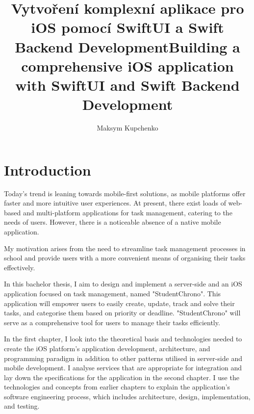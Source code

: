 \documentclass[
  language=english,
  figures=false,
  sourcecodes,
  index
]{kidiplom}
\title[czech]{Vytvoření komplexní aplikace pro iOS pomocí SwiftUI a Swift Backend Development}
\title[english]{Building a comprehensive iOS application with SwiftUI and Swift Backend Development}
\author{Maksym Kupchenko}
\begin{document}
\maketitle



\newcommand{\BibLaTeX}{\textsc{Bib}\LaTeX}

\section{Introduction}

Today's trend is leaning towards mobile-first solutions, as mobile platforms offer faster and more intuitive user experiences. At present, there exist loads of web-based and multi-platform applications for task management, catering to the needs of users. However, there is a noticeable absence of a native mobile application.

My motivation arises from the need to streamline task management processes in school and provide users with a more convenient means of organising their tasks effectively.

In this bachelor thesis, I aim to design and implement a server-side and an iOS application focused on task management, named "StudentChrono". This application will empower users to easily create, update, track and solve their tasks, and categorise them based on priority or deadline. "StudentChrono" will serve as a comprehensive tool for users to manage their tasks efficiently.

In the first chapter, I look into the theoretical basis and technologies needed to create the iOS platform's application development, architecture, and programming paradigm in addition to other patterns utilised in server-side and mobile development. I analyse services that are appropriate for integration and lay down the specifications for the application in the second chapter. I use the technologies and concepts from earlier chapters to explain the application's software engineering process, which includes architecture, design, implementation, and testing.
\end{document}
